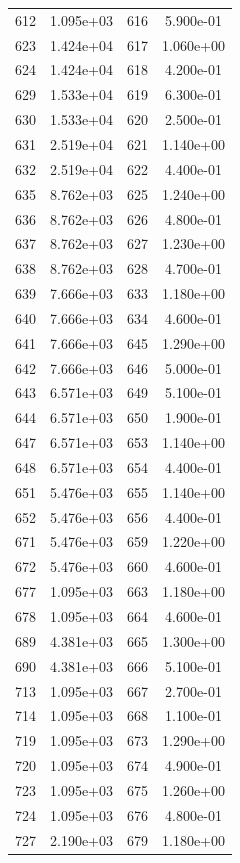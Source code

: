 \documentclass[12pt]{article}
\begin{document}
\begin{longtable}{@{}cccc@{}}
612 & 1.095e+03 & 616 & 5.900e-01 \\
623 & 1.424e+04 & 617 & 1.060e+00 \\
624 & 1.424e+04 & 618 & 4.200e-01 \\
629 & 1.533e+04 & 619 & 6.300e-01 \\
630 & 1.533e+04 & 620 & 2.500e-01 \\
631 & 2.519e+04 & 621 & 1.140e+00 \\
632 & 2.519e+04 & 622 & 4.400e-01 \\
635 & 8.762e+03 & 625 & 1.240e+00 \\
636 & 8.762e+03 & 626 & 4.800e-01 \\
637 & 8.762e+03 & 627 & 1.230e+00 \\
638 & 8.762e+03 & 628 & 4.700e-01 \\
639 & 7.666e+03 & 633 & 1.180e+00 \\
640 & 7.666e+03 & 634 & 4.600e-01 \\
641 & 7.666e+03 & 645 & 1.290e+00 \\
642 & 7.666e+03 & 646 & 5.000e-01 \\
643 & 6.571e+03 & 649 & 5.100e-01 \\
644 & 6.571e+03 & 650 & 1.900e-01 \\
647 & 6.571e+03 & 653 & 1.140e+00 \\
648 & 6.571e+03 & 654 & 4.400e-01 \\
651 & 5.476e+03 & 655 & 1.140e+00 \\
652 & 5.476e+03 & 656 & 4.400e-01 \\
671 & 5.476e+03 & 659 & 1.220e+00 \\
672 & 5.476e+03 & 660 & 4.600e-01 \\
677 & 1.095e+03 & 663 & 1.180e+00 \\
678 & 1.095e+03 & 664 & 4.600e-01 \\
689 & 4.381e+03 & 665 & 1.300e+00 \\
690 & 4.381e+03 & 666 & 5.100e-01 \\
713 & 1.095e+03 & 667 & 2.700e-01 \\
714 & 1.095e+03 & 668 & 1.100e-01 \\
719 & 1.095e+03 & 673 & 1.290e+00 \\
720 & 1.095e+03 & 674 & 4.900e-01 \\
723 & 1.095e+03 & 675 & 1.260e+00 \\
724 & 1.095e+03 & 676 & 4.800e-01 \\
727 & 2.190e+03 & 679 & 1.180e+00 \\

\end{longtable}
\end{document}
